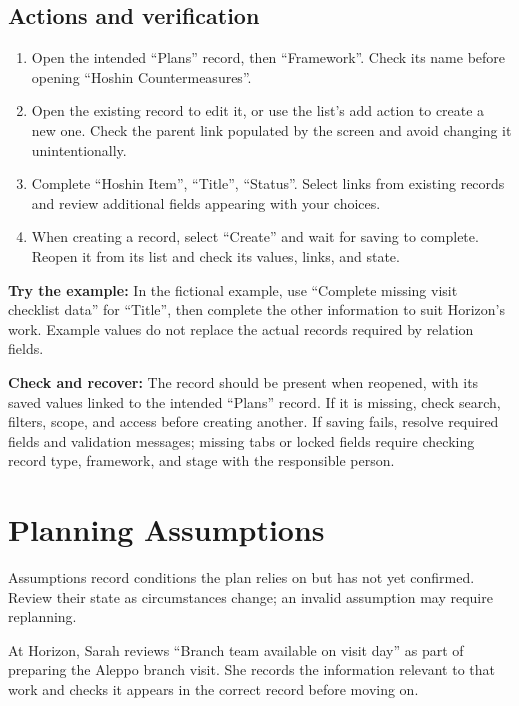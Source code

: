 \subsection{Actions and verification}
\begin{enumerate}
\item Open the intended “Plans” record, then “Framework”. Check its name before opening “Hoshin Countermeasures”.
\item Open the existing record to edit it, or use the list's add action to create a new one. Check the parent link populated by the screen and avoid changing it unintentionally.
\item Complete “Hoshin Item”, “Title”, “Status”. Select links from existing records and review additional fields appearing with your choices.
\item When creating a record, select “Create” and wait for saving to complete. Reopen it from its list and check its values, links, and state.
\end{enumerate}

\textbf{Try the example:} In the fictional example, use “Complete missing visit checklist data” for “Title”, then complete the other information to suit Horizon's work. Example values do not replace the actual records required by relation fields.

\textbf{Check and recover:} The record should be present when reopened, with its saved values linked to the intended “Plans” record. If it is missing, check search, filters, scope, and access before creating another. If saving fails, resolve required fields and validation messages; missing tabs or locked fields require checking record type, framework, and stage with the responsible person.

\clearpage
\section{Planning Assumptions}
\label{sec:projects-feature-planning-assumptions}

Assumptions record conditions the plan relies on but has not yet confirmed. Review their state as circumstances change; an invalid assumption may require replanning.

\begin{rcnote}
At Horizon, Sarah reviews “Branch team available on visit day” as part of preparing the Aleppo branch visit. She records the information relevant to that work and checks it appears in the correct record before moving on.
\end{rcnote}

